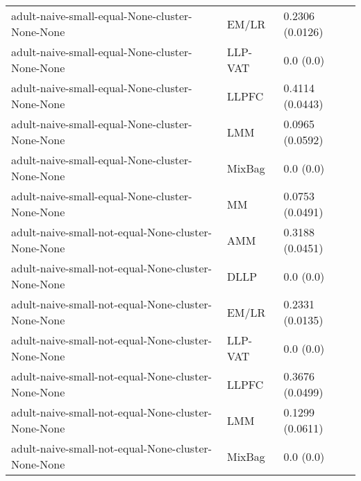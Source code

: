 \begin{longtable}{lll}
                                                               adult-naive-small-equal-None-cluster-None-None &     EM/LR &                           0.2306 (0.0126) \\
                                                               adult-naive-small-equal-None-cluster-None-None &   LLP-VAT &                                 0.0 (0.0) \\
                                                               adult-naive-small-equal-None-cluster-None-None &     LLPFC &                           0.4114 (0.0443) \\
                                                               adult-naive-small-equal-None-cluster-None-None &       LMM &                           0.0965 (0.0592) \\
                                                               adult-naive-small-equal-None-cluster-None-None &    MixBag &                                 0.0 (0.0) \\
                                                               adult-naive-small-equal-None-cluster-None-None &        MM &                           0.0753 (0.0491) \\
                                                           adult-naive-small-not-equal-None-cluster-None-None &       AMM &                           0.3188 (0.0451) \\
                                                           adult-naive-small-not-equal-None-cluster-None-None &      DLLP &                                 0.0 (0.0) \\
                                                           adult-naive-small-not-equal-None-cluster-None-None &     EM/LR &                           0.2331 (0.0135) \\
                                                           adult-naive-small-not-equal-None-cluster-None-None &   LLP-VAT &                                 0.0 (0.0) \\
                                                           adult-naive-small-not-equal-None-cluster-None-None &     LLPFC &                           0.3676 (0.0499) \\
                                                           adult-naive-small-not-equal-None-cluster-None-None &       LMM &                           0.1299 (0.0611) \\
                                                           adult-naive-small-not-equal-None-cluster-None-None &    MixBag &                                 0.0 (0.0) \\

\end{longtable}
